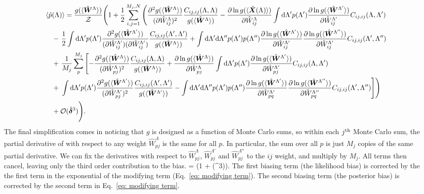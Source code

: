 \documentclass[%
 reprint,
 amsmath,amssymb,
 aps,nofootinbib,nobibnotes,onecolumn,prd
]{revtex4-2}
\begin{document}
\begin{align}
\langle \hat{p}&(\Lambda)\rangle = \frac{
g(\langle \hat{\bm W}^\Lambda\rangle)
}{
\mathcal{Z}
}
\Bigg(
1 
+ 
\frac{1}{2}\sum_{i,j=1}^{M_j,N}
\left(\frac{\partial^2 g(\langle \hat{\bm W}^\Lambda\rangle)}{(\partial \hat{W}_{ij}^\Lambda)^2}\frac{C_{ij,ij}(\Lambda, \Lambda)}{g(\langle \hat{\bm W}^\Lambda\rangle)} 
-
\frac{\partial \ln g(\langle \hat{\bm X}(\Lambda)\rangle)}{\partial \hat{W}_{ij}^\Lambda} \int {\rm d}\Lambda'p(\Lambda')\frac{\partial \ln g(\langle \hat{\bm W}^{\Lambda'}\rangle)}{\partial \hat{W}_{ij}^{\Lambda'}}C_{ij,ij}(\Lambda, \Lambda') \right.
\nonumber \\ 
&- \left. \frac{1}{2}\int {\rm d}\Lambda' p(\Lambda')\frac{\partial^2 g(\langle \hat{\bm W}^{\Lambda'}\rangle)}{(\partial \hat{W}_{ij}^{\Lambda'})(\partial \hat{W}_{ij}^{\Lambda'})}\frac{C_{ij,ij}(\Lambda', \Lambda')}{g(\langle \hat{\bm W}^\Lambda\rangle)}
+
\int {\rm d}\Lambda' {\rm d}\Lambda'' p(\Lambda')p(\Lambda'')\frac{\partial \ln g(\langle \hat{\bm W}^{\Lambda'}\rangle)}{\partial \hat{W}_{ij}^{\Lambda'}}\frac{\partial \ln g(\langle \hat{\bm W}^{\Lambda''}\rangle)}{\partial \hat{W}_{ij}^{\Lambda'}}C_{ij,ij}(\Lambda', \Lambda'') \right. \nonumber \\
&+ 
\left. \frac{1}{M_j}\sum_{p}^{M_j}\left[- \frac{\partial^2g(\langle \hat{\bm W}^\Lambda\rangle)}{(\partial \hat{W}^\Lambda_{pj})^2}
\frac{C_{ij,ij}(\Lambda, \Lambda)}{g(\langle \hat{\bm W}^\Lambda\rangle)}
+ 
\frac{\partial \ln g(\langle \hat{\bm W}^\Lambda\rangle)}{\partial \hat{W}^\Lambda_{pj}}\int {\rm d}\Lambda' p(\Lambda') \frac{\partial \ln g(\langle \hat{\bm W}^{\Lambda'}\rangle)}{\partial \hat{W}^{\Lambda'}_{pj}}C_{ij,ij}(\Lambda, \Lambda') \nonumber \right.\right. \\ 
&+
\left.\left.
\int {\rm d}\Lambda' p(\Lambda')\frac{\partial^2g(\langle \hat{\bm W}^{\Lambda'}\rangle)}{(\partial \hat{W}^{\Lambda'}_{pj})^2}\frac{C_{ij,ij}(\Lambda', \Lambda')}{g(\langle \hat{\bm W}^{\Lambda'}\rangle)}
- 
\int {\rm d}\Lambda' {\rm d}{\Lambda''} p(\Lambda')p(\Lambda'') \frac{\partial \ln g(\langle \hat{\bm W}^{\Lambda'}\rangle)}{\partial \hat{W}^{\Lambda'}_{pq}} \frac{\partial \ln g(\langle \hat{\bm W}^{\Lambda''}\rangle)}{\partial \hat{W}^{\Lambda''}_{pq}}C_{ij,ij}(\Lambda', \Lambda'')
\right]\right) \nonumber \\
&+
\mathcal{O}(\hat{\bm \delta}^3)\Bigg).
\end{align}
The final simplification comes in noticing that $g$ is designed as a function of Monte Carlo sums, so within each $j^{\rm th}$ Monte Carlo sum, the partial derivative of with respect to any weight $\hat{W}_{pj}^\Lambda$ is the same for all $p$. In particular, the sum over all $p$ is just $M_j$ copies of the same partial derivative. We can fix the derivatives with respect to $\hat{W}_{pj}^\Lambda$, $\hat{W}_{pj}^{\Lambda'}$ and $\hat{W}_{pj}^{\Lambda''}$ to the $ij$ weight, and multiply by $M_j$. All terms then cancel, leaving only the third order contribution to the bias.
\beq
{} = \left(1 + (\hat{\bm \delta}^3)\right).
\eeq
The first biasing term (the likelihood bias) is corrected by the the first term in the exponential of the modifying term (Eq.~\ref{eq: modifying term}). The second biasing term (the posterior bias) is corrected by the second term in Eq.~\ref{eq: modifying term}. 
\end{document}
